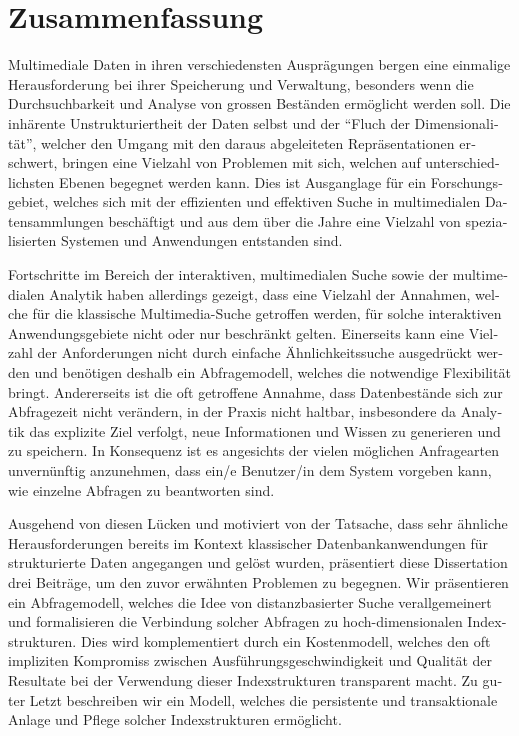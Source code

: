 
\chapter{Zusammenfassung}

\begin{otherlanguage}{ngerman}
Multimediale Daten in ihren verschiedensten Ausprägungen bergen eine einmalige Herausforderung bei ihrer Speicherung und Verwaltung, besonders wenn die Durchsuchbarkeit und Analyse von grossen Beständen ermöglicht werden soll. Die inhärente Unstrukturiertheit der Daten selbst und der ``Fluch der Dimensionalität'', welcher den Umgang mit den daraus abgeleiteten Repräsentationen erschwert, bringen eine Vielzahl von Problemen mit sich, welchen auf unterschiedlichsten Ebenen begegnet werden kann. Dies ist Ausganglage für ein Forschungsgebiet, welches sich mit der effizienten und effektiven Suche in multimedialen Datensammlungen beschäftigt und aus dem über die Jahre eine Vielzahl von spezialisierten Systemen und Anwendungen entstanden sind.

Fortschritte im Bereich der interaktiven, multimedialen Suche sowie der multimedialen Analytik haben allerdings gezeigt, dass eine Vielzahl der Annahmen, welche für die klassische Multimedia-Suche getroffen werden, für solche interaktiven Anwendungsgebiete nicht oder nur beschränkt gelten. Einerseits kann eine Vielzahl der Anforderungen nicht durch einfache Ähnlichkeitssuche ausgedrückt werden und benötigen deshalb ein Abfragemodell, welches die notwendige Flexibilität bringt. Andererseits ist die oft getroffene Annahme, dass Datenbestände sich zur Abfragezeit nicht verändern, in der Praxis nicht haltbar, insbesondere da Analytik das explizite Ziel verfolgt, neue Informationen und Wissen zu generieren und zu speichern. In Konsequenz ist es angesichts der vielen möglichen Anfragearten unvernünftig anzunehmen, dass ein/e Benutzer/in dem System vorgeben kann, wie einzelne Abfragen zu beantworten sind.
 
Ausgehend von diesen Lücken und motiviert von der Tatsache, dass sehr ähnliche Herausforderungen bereits im Kontext klassischer Datenbankanwendungen für strukturierte Daten angegangen und gelöst wurden, präsentiert diese Dissertation drei Beiträge, um den zuvor erwähnten Problemen zu begegnen. Wir präsentieren ein Abfragemodell, welches die Idee von distanzbasierter Suche verallgemeinert und formalisieren die Verbindung solcher Abfragen zu hoch-dimensionalen Indexstrukturen. Dies wird komplementiert durch ein Kostenmodell, welches den oft impliziten Kompromiss zwischen Ausführungsgeschwindigkeit und Qualität der Resultate bei der Verwendung dieser Indexstrukturen transparent macht. Zu guter Letzt beschreiben wir ein Modell, welches die persistente und transaktionale Anlage und Pflege solcher Indexstrukturen ermöglicht.


\end{otherlanguage}
